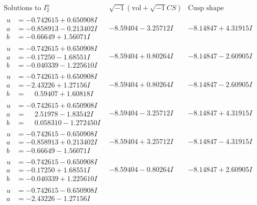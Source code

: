 \documentclass[1p]{elsarticle_modified}
\theoremstyle{definition}
\newcommand{\I}{\sqrt{-1}}
\begin{document}
$$\begin{array}{c|c|c}  
\text{Solutions to }I^u_{2}& \I (\text{vol} + \sqrt{-1}CS) & \text{Cusp shape}\\
 \hline 
\begin{aligned}
u &= -0.742615 + 0.650908 I \\
a &= -0.858913 - 0.213402 I \\
b &= -0.66649 + 1.56071 I\end{aligned}
 & -8.59404 - 3.25712 I & -8.14847 + 4.31915 I \\ \hline\begin{aligned}
u &= -0.742615 + 0.650908 I \\
a &= -0.17250 - 1.68551 I \\
b &= -0.040339 - 1.225610 I\end{aligned}
 & -8.59404 + 0.80264 I & -8.14847 - 2.60905 I \\ \hline\begin{aligned}
u &= -0.742615 + 0.650908 I \\
a &= -2.43226 + 1.27156 I \\
b &= \phantom{-}0.59407 + 1.60818 I\end{aligned}
 & -8.59404 + 0.80264 I & -8.14847 - 2.60905 I \\ \hline\begin{aligned}
u &= -0.742615 + 0.650908 I \\
a &= \phantom{-}2.51978 - 1.83542 I \\
b &= \phantom{-}0.058310 - 1.272450 I\end{aligned}
 & -8.59404 - 3.25712 I & -8.14847 + 4.31915 I \\ \hline\begin{aligned}
u &= -0.742615 - 0.650908 I \\
a &= -0.858913 + 0.213402 I \\
b &= -0.66649 - 1.56071 I\end{aligned}
 & -8.59404 + 3.25712 I & -8.14847 - 4.31915 I \\ \hline\begin{aligned}
u &= -0.742615 - 0.650908 I \\
a &= -0.17250 + 1.68551 I \\
b &= -0.040339 + 1.225610 I\end{aligned}
 & -8.59404 - 0.80264 I & -8.14847 + 2.60905 I \\ \hline\begin{aligned}
u &= -0.742615 - 0.650908 I \\
a &= -2.43226 - 1.27156 I \\

\end{aligned}
\end{array}$$
\end{document}
